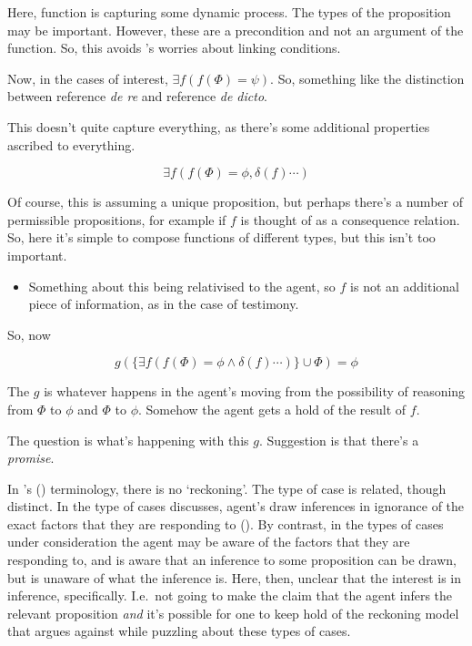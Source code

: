 \documentclass[10pt]{article}
\begin{document}
Here, function is capturing some dynamic process.
The types of the proposition may be important.
However, these are a precondition and not an argument of the function.
So, this avoids \citeauthor{Broome:2019aa}'s worries about linking conditions.


Now, in the cases of interest, \(\exists f(f(\Phi) = \psi)\).
So, something like the distinction between reference \emph{de re} and reference \emph{de dicto}.

This doesn't quite capture everything, as there's some additional properties ascribed to everything.

\[\exists f(f(\Phi) = \phi, \delta(f) \cdots)\]

Of course, this is assuming a unique proposition, but perhaps there's a number of permissible propositions, for example if \(f\) is thought of as a consequence relation.
So, here it's simple to compose functions of different types, but this isn't too important.

\begin{itemize}
\item Something about this being relativised to the agent, so \(f\) is not an additional piece of information, as in the case of testimony.
\end{itemize}

So, now

\[g(\{\exists f(f(\Phi) = \phi \land \delta(f) \cdots)\} \cup \Phi) = \phi\]

The \(g\) is whatever happens in the agent's moving from the possibility of reasoning from \(\Phi\) to \(\phi\) and \(\Phi\) to \(\phi\).
Somehow the agent gets a hold of the result of \(f\).

The question is what's happening with this \(g\).
Suggestion is that there's a \emph{promise}.




In \citeauthor{Siegel:2019aa}'s (\citeyear{Siegel:2019aa}) terminology, there is no `reckoning'.
The type of case is related, though distinct.
In the type of cases \citeauthor{Siegel:2019aa} discusses, agent's draw inferences in ignorance of the exact factors that they are responding to (\citeyear[8]{Siegel:2019aa}).
By contrast, in the types of cases under consideration the agent may be aware of the factors that they are responding to, and is aware that an inference to some proposition can be drawn, but is unaware of what the inference is.
Here, then, unclear that the interest is in inference, specifically.
I.e.\ not going to make the claim that the agent infers the relevant proposition \emph{and} it's possible for one to keep hold of the reckoning model that \citeauthor{Siegel:2019aa} argues against while puzzling about these types of cases.
\end{document}
